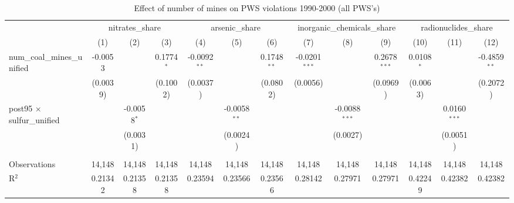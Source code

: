 
\begin{table}[htbp]
   \caption{\label{olsrf2sls_nummine_mine_vio_1990to2000allhucs_coalunified} Effect of number of mines on PWS violations 1990-2000 (all PWS's)}
   \bigskip
   \centering
   \begin{adjustbox}{width = \textwidth, center}
      \begin{tabular}{lcccccccccccc}
         \toprule
          & \multicolumn{3}{c}{nitrates\_share} & \multicolumn{3}{c}{arsenic\_share} & \multicolumn{3}{c}{inorganic\_chemicals\_share} & \multicolumn{3}{c}{radionuclides\_share}\\
                                                          & (1)           & (2)           & (3)           & (4)            & (5)            & (6)           & (7)             & (8)             & (9)            & (10)          & (11)           & (12)\\  
         \midrule 
         num\_coal\_mines\_unified                        & -0.0053       &               & 0.1774$^{*}$  & -0.0092$^{**}$ &                & 0.1748$^{**}$ & -0.0201$^{***}$ &                 & 0.2678$^{***}$ & 0.0108$^{*}$  &                & -0.4859$^{**}$\\   
                                                          & (0.0039)      &               & (0.1002)      & (0.0037)       &                & (0.0802)      & (0.0056)        &                 & (0.0969)       & (0.0063)      &                & (0.2072)\\   
         post95 $\times$ sulfur\_unified                  &               & -0.0058$^{*}$ &               &                & -0.0058$^{**}$ &               &                 & -0.0088$^{***}$ &                &               & 0.0160$^{***}$ &   \\   
                                                          &               & (0.0031)      &               &                & (0.0024)       &               &                 & (0.0027)        &                &               & (0.0051)       &   \\   
          \\
         Observations                                     & 14,148        & 14,148        & 14,148        & 14,148         & 14,148         & 14,148        & 14,148          & 14,148          & 14,148         & 14,148        & 14,148         & 14,148\\  
         R$^2$                                            & 0.21342       & 0.21358       & 0.21358       & 0.23594        & 0.23566        & 0.23566       & 0.28142         & 0.27971         & 0.27971        & 0.42249       & 0.42382        & 0.42382\\  

\end{tabular}
\end{adjustbox}
\end{table}
